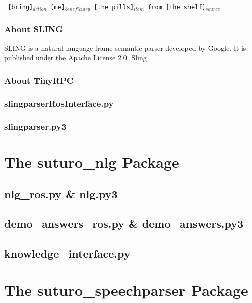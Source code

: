 \documentclass[main.tex]{subfiles}
\begin{document}
        \texttt{ [bring]$_{action}$  [me]$_{beneficiary}$ [the pills]$_{item}$ from [the shelf]$_{source}.$}
		\subsubsection{About SLING}
        SLING is a natural language frame semantic parser developed by Google. It is published under the Apache License 2.0. Sling  
		\subsubsection{About TinyRPC}
		\subsubsection{slingparserRosInterface.py}
		\subsubsection{slingparser.py3}
			
	
	\section{The suturo\_nlg Package}
		\subsection{nlg\_ros.py \& nlg.py3}
		\subsection{demo\_answers\_ros.py \& demo\_answers.py3}
		\subsection{knowledge\_interface.py}
			
	\section{The suturo\_speechparser Package}
		
		
		
\end{document}
